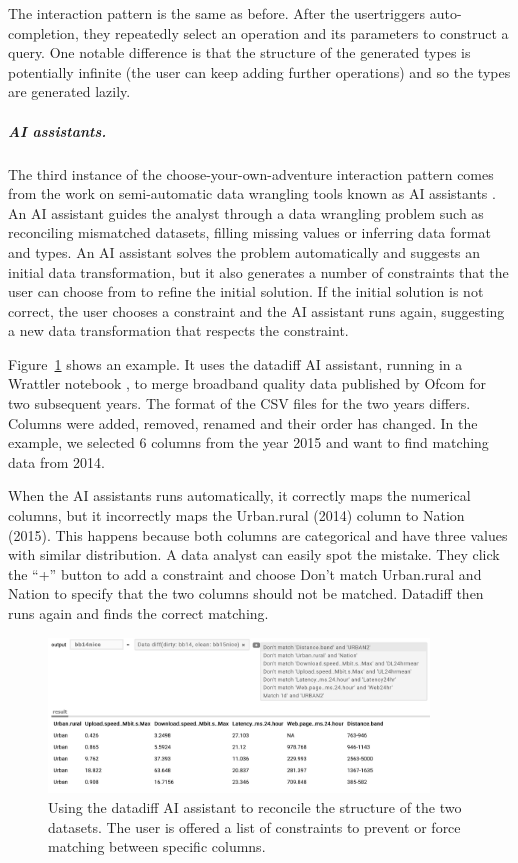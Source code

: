\documentclass[a4paper,UKenglish,cleveref, autoref, thm-restate]{lipics-v2021}
\newcommand{\ident}[1]{\textsf{#1}}
\begin{document}
The interaction pattern is the same as before. After the usertriggers auto-completion, they
repeatedly select an operation and its parameters to construct a query. One notable difference
is that the structure of the generated types is potentially infinite (the user can keep adding
further operations) and so the types are generated lazily.

\subparagraph{AI assistants.}

The third instance of the choose-your-own-adventure interaction pattern comes from the work on
semi-automatic data wrangling tools known as AI assistants \cite{petricek-2023-aias}.
An AI assistant guides the analyst through a data wrangling problem such as reconciling mismatched
datasets, filling missing values or inferring data format and types. An AI assistant solves
the problem automatically and suggests an initial data transformation, but it also generates a
number of constraints that the user can choose from to refine the initial solution. If the initial
solution is not correct, the user chooses a constraint and the AI assistant runs again, suggesting
a new data transformation that respects the constraint.

Figure~\ref{fig:aia} shows an example. It uses the datadiff \cite{sutton-2018-datadiff} AI
assistant, running in a Wrattler notebook \cite{petricek-2018-wrattler}, to merge broadband
quality data published by Ofcom for two subsequent years. The format of the CSV files for the
two years differs. Columns were added, removed, renamed and their order has changed. In the
example, we selected 6 columns from the year 2015 and want to find matching data from 2014.

When the AI assistants runs automatically, it correctly maps the numerical columns, but it
incorrectly maps the \ident{Urban.rural} (2014) column to \ident{Nation} (2015). This happens
because both columns are categorical and have three values with similar distribution. A data
analyst can easily spot the mistake. They click the ``+'' button to add a constraint and choose
\ident{Don't match Urban.rural and Nation} to specify that the two columns should not be matched.
Datadiff then runs again and finds the correct matching.

\begin{figure}[t]
  \includegraphics[width=0.9\textwidth]{fig/aia.png}
  \caption{Using the datadiff AI assistant to reconcile the structure of the two datasets.
    The user is offered a list of constraints to prevent or force matching between specific columns.}
  \label{fig:aia}
\end{figure}
\end{document}
